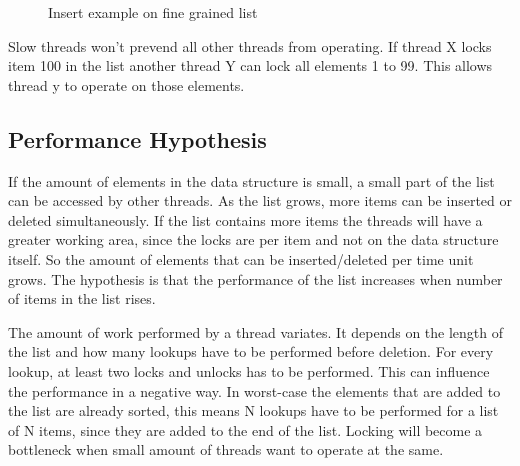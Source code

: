 \documentclass[10pt,a4paper]{article}
\begin{document}
\begin{figure}[h] 
\centerline{ 
    }
    \caption{Insert example on fine grained list}
    \label{fig:fine_insert}
\end{figure}

Slow threads won't prevend all other threads from operating. If thread X locks 
item 100 in the list another thread Y can lock all elements 1 to 99. This allows thread y
to operate on those elements.

\subsection{Performance Hypothesis}
If the amount of elements in the data structure is small, a small part of the list can be accessed by other threads.
As the list grows, more items can be inserted or deleted simultaneously. If the
list contains more items the threads will have a greater working area, since
the locks are per item and not on the data structure itself. So the amount of
elements that can be inserted/deleted per time unit grows. The hypothesis is
that the performance of the list increases when number of items in the list
rises.

The amount of work performed by a thread variates. It depends on the length of the list and how many lookups have to be
performed before deletion. For every lookup, at least two locks and unlocks has
to be performed. This can influence the performance in a negative way. In
worst-case the elements that are added to the list are already sorted, this
means N lookups have to be performed for a list of N items, since they are
added to the end of the list. Locking will become a bottleneck when small
amount of threads want to operate at the same.
\end{document}
